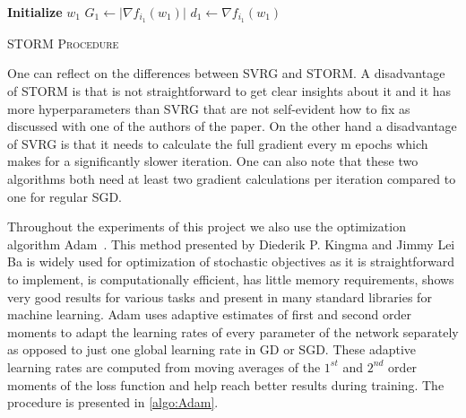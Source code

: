 \documentclass[a4paper,11pt,oneside]{report}
\begin{document}
\begin{algorithm}[H]
    \DontPrintSemicolon
    \SetAlgoNoLine

    \textbf{Initialize} $w_1$\;
    $G_1 \gets \mathopen| {\nabla f_{i_1}(w_1)}\mathclose|$\;
    $d_1 \gets \nabla f_{i_1}(w_1)$\;
    \caption{{\textsc{STORM Procedure}}}
    \label{algo:storm}
\end{algorithm}

One can reflect on the differences between SVRG and STORM. A disadvantage of STORM is that is not straightforward to get clear insights about it and it has more hyperparameters than SVRG that are not self-evident how to fix as discussed with one of the authors of the paper.  On the other hand a disadvantage of SVRG is that it needs to calculate the full gradient every m epochs which makes for a significantly slower iteration. One can also note that these two algorithms both need at least two gradient calculations per iteration compared to one for regular SGD.

Throughout the experiments of this project we also use the optimization algorithm Adam~\cite{kingma2014adam}. This method presented by Diederik P. Kingma and Jimmy Lei Ba is widely used for optimization of stochastic objectives as it is straightforward to implement, is computationally efficient,
has little memory requirements, shows very good results for various tasks and present in many standard libraries for machine learning. Adam uses adaptive estimates of first and second order moments to adapt the learning rates of every parameter of the network separately as opposed to just one global learning rate in GD or SGD. These adaptive learning rates are computed from moving averages of the $1^{st}$ and $2^{nd}$ order moments of the loss function and help reach better results during training. The procedure is presented in \autoref{algo:Adam}. 
 
\end{document}
